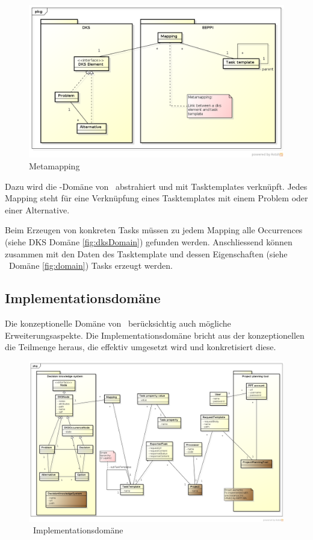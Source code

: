 			\begin{figure}[H]
				\includegraphics[width=\linewidth]{architecture/media/img/metaMapping.png}
				\centering
				\caption{Metamapping}
				\label{fig:metamapping}
			\end{figure}		
			
			Dazu wird die \dks -Domäne von \eeppi\ abstrahiert und mit Task\-tem\-plates verknüpft.
			Jedes Mapping steht für eine Verknüpfung eines Tasktemplates mit einem Problem oder einer Alternative.
			
			Beim Erzeugen von konkreten Tasks müssen zu jedem Mapping alle Occurrences (siehe DKS Domäne \ref{fig:dksDomain}) gefunden werden.
			Anschliessend können zusammen mit den Daten des Tasktemplate und dessen Eigenschaften (siehe \eeppi\ Domäne \ref{fig:domain}) Tasks erzeugt werden.
			
			
		\subsection{Implementationsdomäne}
			Die konzeptionelle Domäne von \eeppi\ berücksichtig auch mögliche Erweiterungsaspekte.
			Die Implementationsdomäne bricht aus der konzeptionellen die Teilmenge heraus, die effektiv umgesetzt wird und konkretisiert diese.
			
			\begin{landscape}
				\begin{figure}[H]
					\includegraphics[width=0.9\linewidth]{architecture/media/img/implementationDomain.png}
					\centering
					\caption{\eeppi\ Implementationsdomäne}
					\label{fig:implementationDomain}
				\end{figure}				
			\end{landscape}	
			
